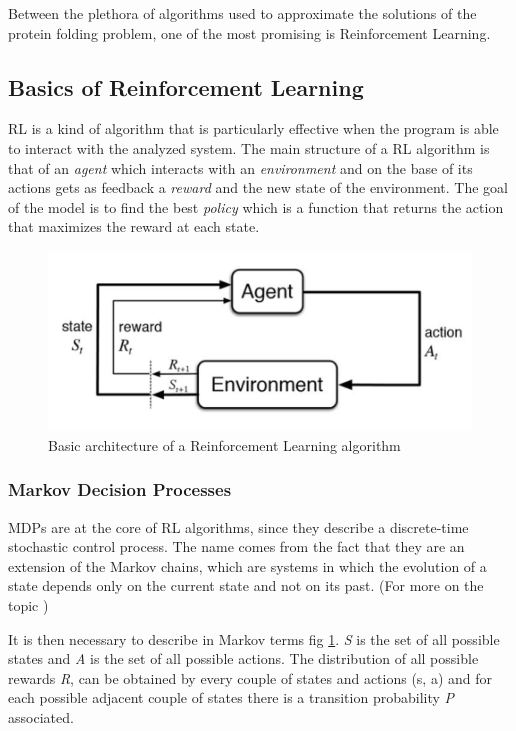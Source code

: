 Between the plethora of algorithms used to approximate the solutions of the protein folding problem, one of the most promising is Reinforcement Learning.

\subsection{Basics of Reinforcement Learning} \label{BRL}

RL is a kind of algorithm that is particularly effective when the program is able to interact with the analyzed system.
The main structure of a RL algorithm is that of an \emph{agent} which interacts with an \emph{environment} and on the base of its actions gets as feedback a \emph{reward} and the new state of the environment.
The goal of the model is to find the best \emph{policy} which is a function that returns the action that maximizes the reward at each state.


\begin{figure}[H]
    \centering
    \includegraphics[scale = 0.5]{img/rl0.png}
    \caption{Basic architecture of a Reinforcement Learning algorithm}
    \label{fig:rl0}
\end{figure}

\subsubsection{Markov Decision Processes}

MDPs are at the core of RL algorithms, since they describe a discrete-time stochastic control process.
The name comes from the fact that they are an extension of the Markov chains, which are systems in which the evolution of a state depends only on the current state and not on its past. (For more on the topic \cite{bellman1957markovian})


It is then necessary to describe in Markov terms fig \ref{fig:rl0}.
\emph{S} is the set of all possible states and \emph{A} is the set of all possible actions.
The distribution of all possible rewards \emph{R}, can be obtained by every couple of states and actions (s, a) and for each possible adjacent couple of states there is a transition probability \emph{P} associated.

